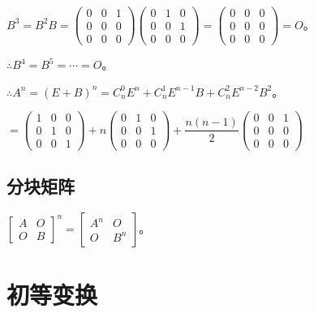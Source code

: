 \documentclass[UTF8, 12pt]{ctexart}
\begin{document}
$B^3=B^2B=\left(\begin{array}{ccc}
    0 & 0 & 1 \\
    0 & 0 & 0 \\
    0 & 0 & 0
\end{array}\right)\left(\begin{array}{ccc}
    0 & 1 & 0 \\
    0 & 0 & 1 \\
    0 & 0 & 0
\end{array}\right)=\left(\begin{array}{ccc}
    0 & 0 & 0 \\
    0 & 0 & 0 \\
    0 & 0 & 0
\end{array}\right)=O$。

$\therefore B^4=B^5=\cdots=O$。

$\therefore A^n=(E+B)^n=C_n^0E^n+C_n^1E^{n-1}B+C_n^2E^{n-2}B^2$。\medskip

$=\left(\begin{array}{ccc}
    1 & 0 & 0 \\
    0 & 1 & 0 \\
    0 & 0 & 1
\end{array}\right)+n\left(\begin{array}{ccc}
    0 & 1 & 0 \\
    0 & 0 & 1 \\
    0 & 0 & 0
\end{array}\right)+\dfrac{n(n-1)}{2}\left(\begin{array}{ccc}
    0 & 0 & 1 \\
    0 & 0 & 0 \\
    0 & 0 & 0
\end{array}\right)$

\subsection{分块矩阵}

$\left[\begin{array}{cc}
    A & O \\
    O & B
\end{array}\right]^n=\left[\begin{array}{cc}
    A^n & O \\
    O & B^n
\end{array}\right]$。

\section{初等变换}
\end{document}
